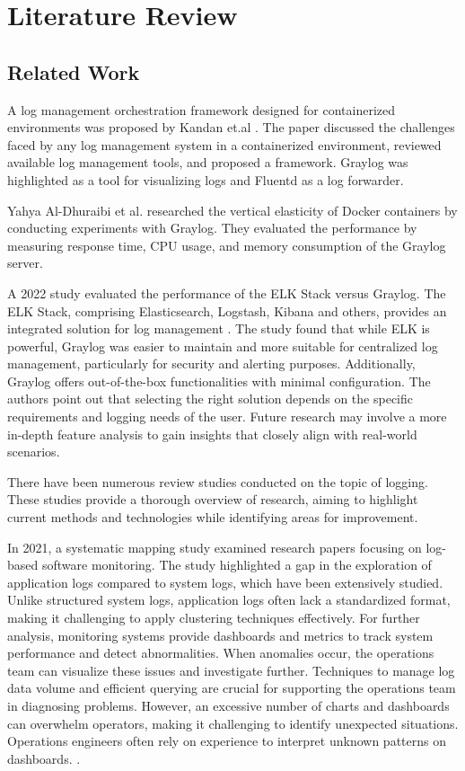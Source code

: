 \documentclass[../main.tex]{subfiles}
\begin{document}
\chapter{Literature Review}

\section{Related Work}

A log management orchestration framework designed for containerized environments was proposed by Kandan et.al \cite{clof}. The paper discussed the challenges faced by any log management system in a containerized environment, reviewed available log management tools, and proposed a framework. Graylog was highlighted as a tool for visualizing logs and Fluentd as a log forwarder.

Yahya Al-Dhuraibi et al. \cite{verticalelasticity} researched the vertical elasticity of Docker containers by conducting experiments with Graylog. They evaluated the performance by measuring response time, CPU usage, and memory consumption of the Graylog server.

A 2022 study evaluated the performance of the ELK Stack versus Graylog. The ELK Stack, comprising Elasticsearch, Logstash, Kibana and others, provides an integrated solution for log management \cite{elk}. The study found that while ELK is powerful, Graylog was easier to maintain and more suitable for centralized log management, particularly for security and alerting purposes. Additionally, Graylog offers out-of-the-box functionalities with minimal configuration. The authors point out that selecting the right solution depends on the specific requirements and logging needs of the user. Future research may involve a more in-depth feature analysis to gain insights that closely align with real-world scenarios. \cite{elkvsgraylog}

There have been numerous review studies conducted on the topic of logging. These studies provide a thorough overview of research, aiming to highlight current methods and technologies while identifying areas for improvement.

In 2021, a systematic mapping study examined research papers focusing on log-based software monitoring. The study highlighted a gap in the exploration of application logs compared to system logs, which have been extensively studied. Unlike structured system logs, application logs often lack a standardized format, making it challenging to apply clustering techniques effectively. For further analysis, monitoring systems provide dashboards and metrics to track system performance and detect abnormalities. When anomalies occur, the operations team can visualize these issues and investigate further. Techniques to manage log data volume and efficient querying are crucial for supporting the operations team in diagnosing problems. However, an excessive number of charts and dashboards can overwhelm operators, making it challenging to identify unexpected situations. Operations engineers often rely on experience to interpret unknown patterns on dashboards. \cite{logbasedmonitoring}.
\end{document}
